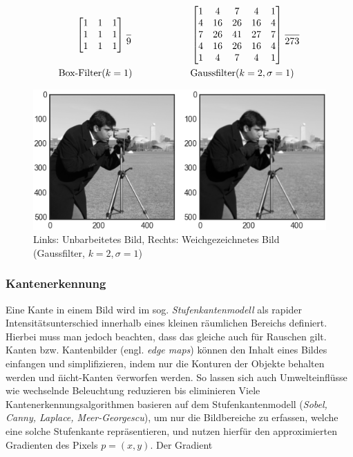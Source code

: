 \begin{align}
    \begin{bmatrix}
        1 & 1 & 1 \\
        1 & 1 & 1 \\
        1 & 1 & 1
    \end{bmatrix} 
    \frac{}{9}
    & \qquad \qquad \qquad
    \begin{bmatrix}
        1 & 4 & 7 & 4 & 1 \\
        4 & 16 & 26 & 16 & 4\\
        7 & 26 & 41 & 27 & 7\\
        4 & 16 & 26 & 16 & 4\\
        1 & 4 & 7 & 4 & 1 
    \end{bmatrix} 
    \frac{}{273}\\
    \text{Box-Filter}(k = 1) & \qquad \qquad \qquad \text{Gaussfilter}(k = 2, \sigma = 1)\notag
\end{align}
\begin{figure}[htbp]
    \centering
    \includegraphics[width=15cm]{bilder/gaussian_k3_s1.png}
    \caption[Beispiel Weichzeichnen]{Links: Unbarbeitetes Bild, Rechts: Weichgezeichnetes Bild (Gaussfilter, $k = 2, \sigma = 1$)}
    \label{fig:smoothing}
    \end{figure}

\subsubsection*{Kantenerkennung}
Eine Kante in einem Bild wird im sog. \textit{Stufenkantenmodell} als rapider Intensitätsunterschied innerhalb eines kleinen räumlichen Bereichs definiert. Hierbei muss man jedoch beachten,
dass das gleiche auch für Rauschen gilt. Kanten bzw. Kantenbilder (engl. \textit{edge maps}) können den Inhalt eines Bildes einfangen und simplifizieren, indem nur die Konturen der Objekte
behalten werden und \" nicht-Kanten \" verworfen werden. So lassen sich auch Umwelteinflüsse wie wechselnde Beleuchtung reduzieren bis eliminieren\cite[S.\. 10f.]{Klette14} 
Viele Kantenerkennungsalgorithmen basieren auf dem Stufenkantenmodell (\textit{Sobel, Canny, Laplace, Meer-Georgescu}), um nur die Bildbereiche zu erfassen, welche eine solche Stufenkante repräsentieren,
und nutzen hierfür den approximierten Gradienten des Pixels $p = (x,y)$. Der Gradient

